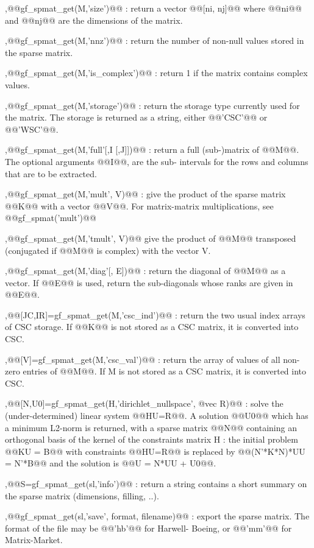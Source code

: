 \begin{cmddescription}
  \sep{@@gf_spmat_get(M,'size')@@} :
    return a vector @@[ni, nj]@@ where @@ni@@ and @@nj@@ are the dimensions of the matrix.

    \sep{@@gf_spmat_get(M,'nnz')@@} : return the number of non-null values stored in the sparse matrix.

    \sep{@@gf_spmat_get(M,'is_complex')@@} : return 1 if the matrix contains complex values.

    \sep{@@gf_spmat_get(M,'storage')@@} : return the storage type currently used for the matrix.  The storage is
  returned as a string, either @@'CSC'@@ or @@'WSC'@@.

  \sep{@@gf_spmat_get(M,'full'[,I [,J]])@@} : return a full (sub-)matrix of @@M@@.  The optional arguments @@I@@, are the sub-
    intervals for the rows and columns that are to be extracted.

    \sep{@@gf_spmat_get(M,'mult', V)@@} : give the product of the sparse matrix @@K@@ with a vector @@V@@.  For matrix-matrix
    multiplications, see @@gf_spmat('mult')@@

    \sep{@@gf_spmat_get(M,'tmult', V)@@} give the product of @@M@@ transposed (conjugated if @@M@@ is complex) with the vector V.

    \sep{@@gf_spmat_get(M,'diag'[, E])@@} : return the diagonal of @@M@@ as a
  vector. If @@E@@ is used, return the sub-diagonals whose ranks are
  given in @@E@@.

  \sep{@@[JC,IR]=gf_spmat_get(M,'csc_ind')@@} : return the two usual index
  arrays of CSC storage.  If @@K@@ is not stored as a CSC matrix, it
  is converted into CSC.

  \sep{@@[V]=gf_spmat_get(M,'csc_val')@@} : return the array of values of all
  non-zero entries of @@M@@.  If M is not stored as a CSC matrix, it
  is converted into CSC.

  \sep{@@[N,U0]=gf_spmat_get(H,'dirichlet_nullspace', @vec R)@@} : solve the (under-determined) linear system @@HU=R@@. A solution @@U0@@ which has a minimum L2-norm is returned, with a sparse matrix @@N@@ containing an orthogonal basis of the
    kernel of the constraints matrix H : the initial problem @@KU = B@@ with constraints @@HU=R@@ is replaced by @@(N'*K*N)*UU = N'*B@@ and the solution is @@U = N*UU + U0@@.

    \sep{@@S=gf_spmat_get(sl,'info')@@} : return a string contains a short summary on the sparse matrix (dimensions, filling, ..).

    \sep{@@gf_spmat_get(sl,'save', \tstr format, \tstr filename)@@} : export the sparse matrix. The format of the file may be @@'hb'@@ for Harwell-
    Boeing, or @@'mm'@@ for Matrix-Market.
\end{cmddescription}
\newpage

